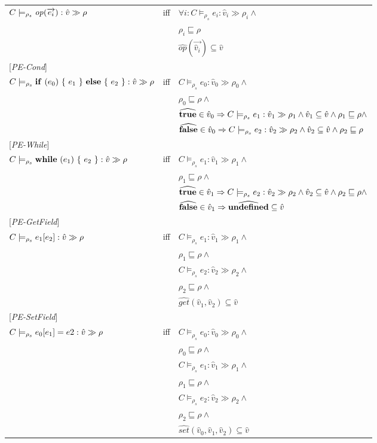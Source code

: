 \documentclass[[12pt,a4paper,twoside,openrigh]{article}
\newcommand{\vat}[0]{\hat{v}}
\newcommand{\modelrho}{\models_{\rho_s}}
\newcommand{\caesti}[2]{C \modelrho #1 : \vat_{#2} \gg \rho_{#2}}
\newcommand{\caest}[1]{C \modelrho #1 : \vat \gg \rho}
\begin{document}
\begin{tabular}{l l l}
$\caest {\op (\vec{e_i})} $& iff &$\forall i : \caesti {e_i} {i} \wedge $\\
&& $\rho_i \sqsubseteq \rho$\\
&& $\widehat{op} (\vec{\vat_i}) \subseteq \vat $\\
{[\textit{PE-Cond}]}\\
$\caest {\cond {e_0} {e_1} {e_2}} $& iff &$ \caesti {e_0} {0} \wedge $\\
&& $\rho_0 \sqsubseteq \rho \wedge$ \\
&& $\widehat{\true} \in \vat_0 \Rightarrow \caesti {e_1} {1} \wedge \vat_1 \subseteq \vat \wedge \rho_1 \sqsubseteq \rho \wedge$ \\
&& $\widehat{\false} \in \vat_0 \Rightarrow \caesti {e_2} {2} \wedge \vat_2 \subseteq \vat \wedge \rho_2 \sqsubseteq \rho$ \\
{[\textit{PE-While}]}\\
$\caest {\while {e_1} {e_2}} $& iff &$ \caesti {e_1} {1} \wedge $\\
&& $\rho_1 \sqsubseteq \rho \wedge$ \\
&& $\widehat{\true} \in \vat_1 \Rightarrow \caesti {e_2} {2} \wedge \vat_2 \subseteq \vat \wedge \rho_2 \sqsubseteq \rho \wedge$\\
&& $\widehat{\false} \in \vat_1 \Rightarrow \widehat{\undef} \subseteq \vat$\\
{[\textit{PE-GetField}]}\\
$\caest {\lookup {e_1} {e_2}} $& iff &$ \caesti {e_1} {1} \wedge $\\
&& $\rho_1 \sqsubseteq \rho \wedge$ \\
&& $ \caesti {e_2} {2} \wedge $ \\
&& $\rho_2 \sqsubseteq \rho \wedge$ \\
&& $\widehat{get} (\vat_1, \vat_2) \subseteq \vat$ \\
{[\textit{PE-SetField}]}\\
$\caest {\store {e_0} {e_1} {e2}} $& iff &$ \caesti {e_0} {0} \wedge $\\
&& $\rho_0 \sqsubseteq \rho \wedge$ \\
&& $ \caesti {e_1} {1} \wedge $ \\
&& $\rho_1 \sqsubseteq \rho \wedge$ \\
&& $ \caesti {e_2} {2} \wedge $ \\
&& $\rho_2 \sqsubseteq \rho \wedge$ \\
&& $\widehat{set} (\vat_0, \vat_1, \vat_2) \subseteq \vat$ \\
\end{tabular}
\end{document}
